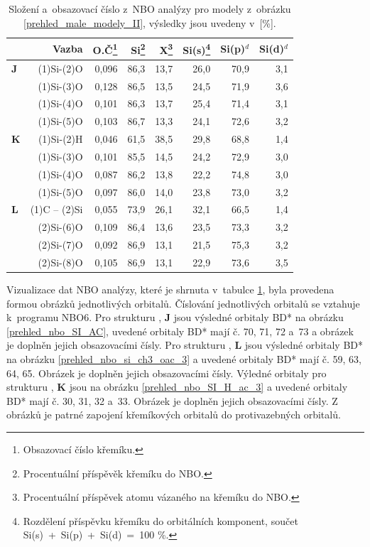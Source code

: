 \documentclass[
digital, %
table,   %
nolof,     %
nolot,     %
oneside,
]{fithesis3}
\begin{document}
\begin{table}[H]
\caption{Složení a~obsazovací číslo z~NBO analýzy pro modely z~obrázku \ref{prehled_male_modely_II}, výsledky jsou uvedeny v~[\%].}
\begin{minipage}{\textwidth}
\begin{center}
\begin{tabular}{|l|r|r|r|r|r|r|r|}
\hline\label{nbo_reaktanty_porovnani}&  Vazba & O.Č\footnote{Obsazovací číslo křemíku.} & Si\footnote{Procentuální příspěvěk křemíku do NBO.} & X\footnote{Procentuální příspěvek atomu vázaného na křemíku do NBO.} & Si(s)\footnote{Rozdělení příspěvku křemíku do orbitálních komponent, součet Si(s)~+~Si(p)~+~Si(d)~=~100 \%.} & Si(p)$^d$ &Si(d)$^d$ \\ \hline
\textbf{J} & (1)Si-(2)O & 0,096 & 86,3  & 13,7  & 26,0  & 70,9  & 3,1  \\ \hline
& (1)Si-(3)O & 0,128 & 86,5  & 13,5  & 24,5  & 71,9  & 3,6  \\ \hline
& (1)Si-(4)O & 0,101 & 86,3  & 13,7  & 25,4  & 71,4  & 3,1  \\ \hline
& (1)Si-(5)O & 0,103 & 86,7  & 13,3  & 24,1  & 72,6  & 3,2  \\ \hline

\textbf{K} & (1)Si-(2)H & 0,046 & 61,5  & 38,5  & 29,8  & 68,8  & 1,4  \\ \hline
& (1)Si-(3)O & 0,101 & 85,5  & 14,5  & 24,2  & 72,9  & 3,0  \\ \hline
& (1)Si-(4)O & 0,087 & 86,2  & 13,8  & 22,2  & 74,8  & 3,0  \\ \hline
& (1)Si-(5)O & 0,097 & 86,0  & 14,0  & 23,8  & 73,0  & 3,2  \\ \hline
\textbf{L} & (1)C -- (2)Si & 0,055 & 73,9  & 26,1  & 32,1  & 66,5  & 1,4  \\ \hline
& (2)Si-(6)O & 0,109 & 86,4  & 13,6  & 23,5  & 73,3  & 3,2  \\ \hline
& (2)Si-(7)O & 0,092 & 86,9  & 13,1  & 21,5  & 75,3  & 3,2  \\ \hline
& (2)Si-(8)O & 0,105 & 86,9  & 13,1  & 22,9  & 73,6  & 3,5  \\ \hline
\end{tabular}
\end{center}\end{minipage}\end{table}

Vizualizace dat NBO analýzy, které je shrnuta v~tabulce \ref{nbo_reaktanty_porovnani}, byla provedena formou obrázků jednotlivých orbitalů. Číslování jednotlivých orbitalů se vztahuje k~programu NBO6. Pro strukturu , \textbf{J} jsou výsledné orbitaly BD* na obrázku \ref{prehled_nbo_SI_AC}, uvedené orbitaly BD* mají č. 70, 71, 72 a~73 a obrázek je doplněn jejich obsazovacími čísly. Pro strukturu , \textbf{L} jsou výsledné orbitaly BD* na obrázku \ref{prehled_nbo_si_ch3_oac_3} a uvedené orbitaly BD* mají č. 59, 63, 64, 65. Obrázek je doplněn jejich obsazovacími čísly. Výledné orbitaly pro strukturu , \textbf{K} jsou na obrázku \ref{prehled_nbo_SI_H_ac_3} a uvedené orbitaly BD* mají č. 30, 31, 32 a~33. Obrázek je doplněn jejich obsazovacími čísly. Z obrázků je patrné zapojení křemíkových orbitalů do protivazebných orbitalů. \\
\end{document}
